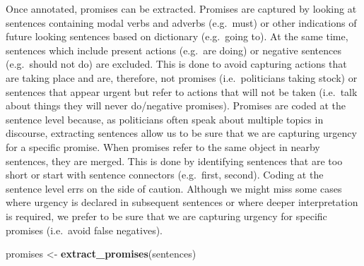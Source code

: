 \documentclass[
]{article}
\newenvironment{Shaded}{\begin{snugshade}}{\end{snugshade}}
\newcommand{\FunctionTok}[1]{\textcolor[rgb]{0.13,0.29,0.53}{\textbf{#1}}}
\newcommand{\NormalTok}[1]{#1}
\newcommand{\OtherTok}[1]{\textcolor[rgb]{0.56,0.35,0.01}{#1}}
\begin{document}
Once annotated, promises can be extracted. Promises are captured by
looking at sentences containing modal verbs and adverbs (e.g.~must) or
other indications of future looking sentences based on dictionary
(e.g.~going to). At the same time, sentences which include present
actions (e.g.~are doing) or negative sentences (e.g.~should not do) are
excluded. This is done to avoid capturing actions that are taking place
and are, therefore, not promises (i.e.~politicians taking stock) or
sentences that appear urgent but refer to actions that will not be taken
(i.e.~talk about things they will never do/negative promises). Promises
are coded at the sentence level because, as politicians often speak
about multiple topics in discourse, extracting sentences allow us to be
sure that we are capturing urgency for a specific promise. When promises
refer to the same object in nearby sentences, they are merged. This is
done by identifying sentences that are too short or start with sentence
connectors (e.g.~first, second). Coding at the sentence level errs on
the side of caution. Although we might miss some cases where urgency is
declared in subsequent sentences or where deeper interpretation is
required, we prefer to be sure that we are capturing urgency for
specific promises (i.e.~avoid false negatives).

\begin{Shaded}
\begin{Highlighting}[]
\NormalTok{promises }\OtherTok{\textless{}{-}} \FunctionTok{extract\_promises}\NormalTok{(sentences)}
\end{Highlighting}
\end{Shaded}
\end{document}
